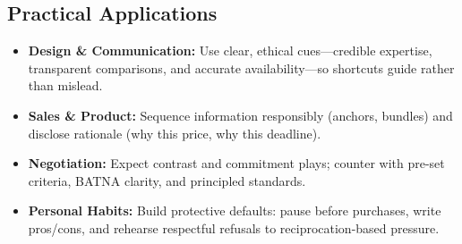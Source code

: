\subsection*{Practical Applications}
\begin{itemize}
    \item \textbf{Design \& Communication:} Use clear, ethical cues—credible expertise, transparent comparisons, and accurate availability—so shortcuts guide rather than mislead.
    \item \textbf{Sales \& Product:} Sequence information responsibly (anchors, bundles) and disclose rationale (why this price, why this deadline).
    \item \textbf{Negotiation:} Expect contrast and commitment plays; counter with pre-set criteria, BATNA clarity, and principled standards.
    \item \textbf{Personal Habits:} Build protective defaults: pause before purchases, write pros/cons, and rehearse respectful refusals to reciprocation-based pressure.
\end{itemize}
